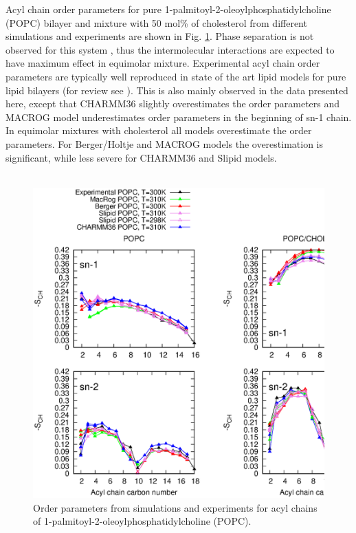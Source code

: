 \documentclass[aps,prl,superscriptaddress,twocolumn]{revtex4}
\begin{document}
Acyl chain order parameters for pure 1-palmitoyl-2-oleoylphosphatidylcholine (POPC) bilayer
and mixture with 50 mol\% of cholesterol from different simulations and experiments
are shown in Fig. \ref{OrderParametersCHOL}. Phase separation is not observed for this system \cite{ionova12,ferreira13},
thus the intermolecular interactions are expected to have maximum effect in equimolar mixture.
Experimental acyl chain order parameters are typically well reproduced in state of the art lipid models
for pure lipid bilayers (for review see \cite{ollila16}). This is also mainly observed in the data
presented here, except that CHARMM36 slightly overestimates the order parameters and MACROG model
underestimates order parameters in the beginning of sn-1 chain. In equimolar mixtures with cholesterol
all models overestimate the order parameters. For Berger/Holtje and MACROG models the overestimation is significant,
while less severe for CHARMM36 and Slipid models.\\
 \\
\begin{figure}[]
  \centering
  \includegraphics[width=17.2cm]{../FIGS/OrderParametersCHOL.eps}
  \caption{\label{OrderParametersCHOL}
    Order parameters from simulations and experiments for acyl chains of  1-palmitoyl-2-oleoylphosphatidylcholine (POPC).
  }
\end{figure}
\end{document}
